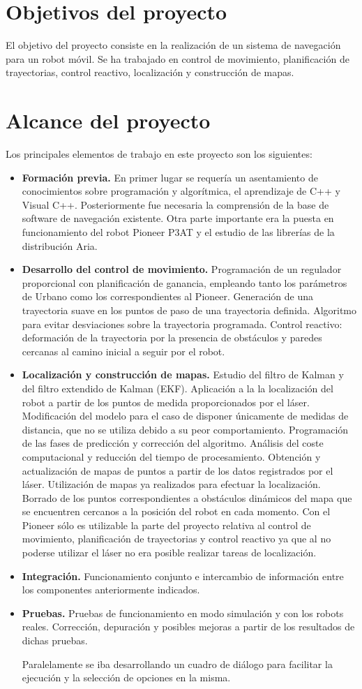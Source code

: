 \section{Objetivos del proyecto}
El objetivo del proyecto consiste en la realización de un sistema de navegación para un robot móvil. Se ha trabajado en control de movimiento, planificación de trayectorias, control reactivo, localización y construcción de mapas.

\section{Alcance del proyecto}
Los principales elementos de trabajo en este proyecto son los siguientes:
\begin{itemize}
  \item \textbf{Formación previa.} En primer lugar se requería un asentamiento de conocimientos sobre programación y algorítmica, el aprendizaje de C++ y Visual C++. Posteriormente fue necesaria la comprensión de la base de software de navegación existente. Otra parte importante era la puesta en funcionamiento del robot Pioneer P3AT y el estudio de las librerías de la distribución Aria.
  \item \textbf{Desarrollo del control de movimiento.} Programación de un regulador proporcional con planificación de ganancia, empleando tanto los parámetros de Urbano como los correspondientes al Pioneer. Generación de una trayectoria suave en los puntos de paso de una trayectoria definida. Algoritmo para evitar desviaciones sobre la trayectoria programada. Control reactivo: deformación de la trayectoria por la presencia de obstáculos y paredes cercanas al camino inicial a seguir por el robot.
  \item \textbf{Localización y construcción de mapas.} Estudio del filtro de Kalman y del filtro extendido de Kalman (EKF). Aplicación a la la localización del robot a partir de los puntos de medida proporcionados por el láser. Modificación del modelo para el caso de disponer únicamente de medidas de distancia, que no se utiliza debido a su peor comportamiento. Programación de las fases de predicción y corrección del algoritmo. Análisis del coste computacional y reducción del tiempo de procesamiento. Obtención y actualización de mapas de puntos a partir de los datos registrados por el láser. Utilización de mapas ya realizados para efectuar la localización. Borrado de los puntos correspondientes a obstáculos dinámicos del mapa que se encuentren cercanos a la posición del robot en cada momento.
      Con el Pioneer sólo es utilizable la parte del proyecto relativa al control de movimiento, planificación de trayectorias y control reactivo ya que al no poderse utilizar el láser no era posible realizar tareas de localización.
  \item \textbf{Integración.} Funcionamiento conjunto e intercambio de información entre los componentes anteriormente indicados.
  \item \textbf{Pruebas.} Pruebas de funcionamiento en modo simulación y con los robots reales. Corrección, depuración y posibles mejoras a partir de los resultados de dichas pruebas.

  Paralelamente se iba desarrollando un cuadro de diálogo para facilitar la ejecución y la selección de opciones en la misma.
\end{itemize}
